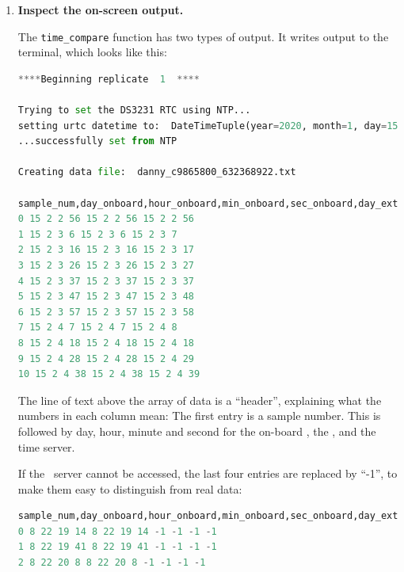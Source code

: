 \begin{enumerate}
	It's a good idea to first do some short test sampling runs, with parameters set so that the entire process will take just a couple minutes.
	The parameters above are an example of this. 
	If there is a problem with hardware or WiFi, these parameters enable you to detect that quickly.
	
	\item \textbf{Inspect the on-screen output.}
	
	The \lstinline{time_compare} function has two types of output. It writes output to the terminal, which looks like this:
\begin{lstlisting}[language=Python]
****Beginning replicate  1  ****

Trying to set the DS3231 RTC using NTP...
setting urtc datetime to:  DateTimeTuple(year=2020, month=1, day=15, weekday=None, hour=2, minute=2, second=56, millisecond=None)
...successfully set from NTP

Creating data file:  danny_c9865800_632368922.txt

sample_num,day_onboard,hour_onboard,min_onboard,sec_onboard,day_external,hour_external,min_external,sec_external,day_NTP,hour_NTP,min_NTP,sec_NTP
0 15 2 2 56 15 2 2 56 15 2 2 56 
1 15 2 3 6 15 2 3 6 15 2 3 7 
2 15 2 3 16 15 2 3 16 15 2 3 17 
3 15 2 3 26 15 2 3 26 15 2 3 27 
4 15 2 3 37 15 2 3 37 15 2 3 37 
5 15 2 3 47 15 2 3 47 15 2 3 48 
6 15 2 3 57 15 2 3 57 15 2 3 58 
7 15 2 4 7 15 2 4 7 15 2 4 8 
8 15 2 4 18 15 2 4 18 15 2 4 18 
9 15 2 4 28 15 2 4 28 15 2 4 29 
10 15 2 4 38 15 2 4 38 15 2 4 39 
\end{lstlisting}
	The line of text above the array of data is a ``header'', explaining what the numbers in each column mean: 
	The first entry is a sample number.
	This is followed by day, hour, minute and second for the on-board \rtc, the  \rtc, and the \ntp time server.
	
	\smallskip
	If the \ntp	\, server cannot be accessed, the last four entries are replaced by ``-1'', to make them easy to distinguish from real data:	
\begin{lstlisting}[language=Python]
sample_num,day_onboard,hour_onboard,min_onboard,sec_onboard,day_external,hour_external,min_external,sec_external,day_NTP,hour_NTP,min_NTP,sec_NTP
0 8 22 19 14 8 22 19 14 -1 -1 -1 -1 
1 8 22 19 41 8 22 19 41 -1 -1 -1 -1 
2 8 22 20 8 8 22 20 8 -1 -1 -1 -1 
\end{lstlisting}
	
	

\end{enumerate}
